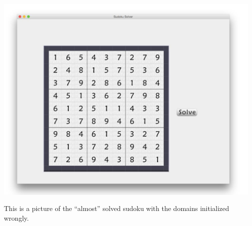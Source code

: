 \includegraphics[scale=0.7]{./almost}

This is a picture of the “almost” solved sudoku with the domains initialized wrongly. 










